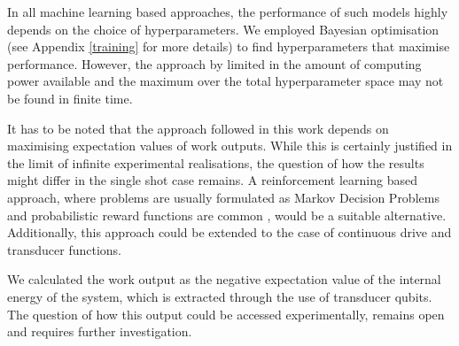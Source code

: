 In all machine learning based approaches, the performance of such models highly depends on the choice of hyperparameters.
We employed Bayesian optimisation (see Appendix \ref{training} for more details) to find hyperparameters that maximise performance.
However, the approach by limited in the amount of computing power available and the maximum over the total hyperparameter space may not be found in finite time.

It has to be noted that the approach followed in this work depends on maximising expectation values of work outputs.
While this is certainly justified in the limit of infinite experimental realisations, the question of how the results might differ in the single shot case remains.
A reinforcement learning based approach, where problems are usually formulated as Markov Decision Problems and probabilistic reward functions are common \cite{Sutton1998}, would be a suitable alternative.
Additionally, this approach could be extended to the case of continuous drive and transducer functions.

We calculated the work output as the negative expectation value of the internal energy of the system, which is extracted through the use of transducer qubits.
The question of how this output could be accessed experimentally, remains open and requires further investigation.